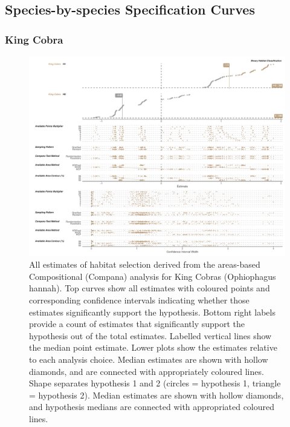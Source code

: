 \documentclass[10pt,a4paper]{article}
\begin{document}
\subsection{Species-by-species Specification Curves}\label{species-by-species-specification-curves}

\subsubsection{King Cobra}\label{king-cobra-2}

\begin{figure}[h]
\includegraphics[width=1\linewidth]{../../figures/specCurve_King Cobra_area} \caption{All estimates of habitat selection derived from the areas-based Compositional (Compana) analysis for King Cobras (Ophiophagus hannah). Top curves show all estimates with coloured points and corresponding confidence intervals indicating whether those estimates significantly support the hypothesis. Bottom right labels provide a count of estimates that significantly support the hypothesis out of the total estimates. Labelled vertical lines show the median point estimate. Lower plots show the estimates relative to each analysis choice. Median estimates are shown with hollow diamonds, and are connected with appropriately coloured lines. Shape separates hypothesis 1 and 2 (circles = hypothesis 1, triangle = hypothesis 2). Median estimates are shown with hollow diamonds, and hypothesis medians are connected with appropriated coloured lines. }\label{fig:specCurveAreaOPHA}
\end{figure}
\end{document}
